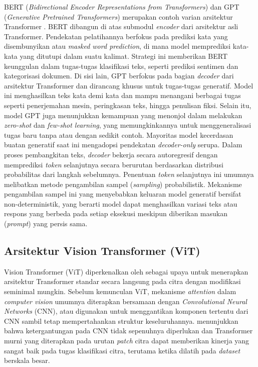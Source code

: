 BERT (\textit{Bidirectional Encoder Representations from Transformers}) dan GPT (\textit{Generative Pretrained Transformers}) merupakan contoh varian arsitektur Transformer \parencite{raschkaBuildLargeLanguage2025}. BERT dibangun di atas submodul \textit{encoder} dari arsitektur asli Transformer. Pendekatan pelatihannya berfokus pada prediksi kata yang disembunyikan atau \textit{masked word prediction}, di mana model memprediksi kata-kata yang ditutupi dalam suatu kalimat. Strategi ini memberikan BERT keunggulan dalam tugas-tugas klasifikasi teks, seperti prediksi sentimen dan kategorisasi dokumen. Di sisi lain, GPT berfokus pada bagian \textit{decoder} dari arsitektur Transformer dan dirancang khusus untuk tugas-tugas generatif. Model ini menghasilkan teks kata demi kata dan mampu menangani berbagai tugas seperti penerjemahan mesin, peringkasan teks, hingga penulisan fiksi. Selain itu, model GPT juga menunjukkan kemampuan yang menonjol dalam melakukan \textit{zero-shot} dan \textit{few-shot learning}, yang memungkinkannya untuk menggeneralisasi tugas baru tanpa atau dengan sedikit contoh. Mayoritas model kecerdasan buatan generatif saat ini mengadopsi pendekatan \textit{decoder-only} serupa. Dalam proses pembangkitan teks, \textit{decoder} bekerja secara autoregresif dengan memprediksi \textit{token} selanjutnya secara berurutan berdasarkan distribusi probabilitas dari langkah sebelumnya. Penentuan \textit{token} selanjutnya ini umumnya melibatkan metode pengambilan sampel (\textit{sampling}) probabilistik. Mekanisme pengambilan sampel ini yang menyebabkan keluaran model generatif bersifat non-deterministik, yang berarti model dapat menghasilkan variasi teks atau respons yang berbeda pada setiap eksekusi meskipun diberikan masukan (\textit{prompt}) yang persis sama.

\subsection{Arsitektur Vision Transformer (ViT)}
Vision Transformer (ViT) diperkenalkan oleh \textcite{dosovitskiyImageWorth16x162020a} sebagai upaya untuk menerapkan arsitektur Transformer standar secara langsung pada citra dengan modifikasi seminimal mungkin. Sebelum kemunculan ViT, mekanisme \textit{attention} dalam \textit{computer vision} umumnya diterapkan bersamaan dengan \textit{Convolutional Neural Networks} (CNN), atau digunakan untuk menggantikan komponen tertentu dari CNN sambil tetap mempertahankan struktur keseluruhannya. \textcite{dosovitskiyImageWorth16x162020a} menunjukkan bahwa ketergantungan pada CNN tidak sepenuhnya diperlukan dan Transformer murni yang diterapkan pada urutan \textit{patch} citra dapat memberikan kinerja yang sangat baik pada tugas klasifikasi citra, terutama ketika dilatih pada \textit{dataset} berskala besar.

